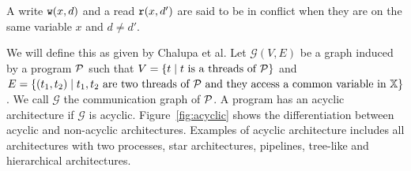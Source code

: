 \smallskip 

 A write $\mathtt{w}(x,d)$ and a read $\mathtt{r}(x,d')$ are said to be in conflict when they are on the same variable $x$ 
and $d \neq d'$. 

\smallskip

 We will define this as given by Chalupa et al. \cite{Data-centricDPOR} Let $\mathcal{G}(V,E)$ be a graph induced by a program ${\mathcal P}$ such that $V=\{t\mid t \text{ is a threads of }{\mathcal P}\}$ and $E=\{(t_1,t_2)\mid t_1,t_2 \text{ are two threads of }{\mathcal P} \text{ and they access a common variable in } {\mathbb X} \}$. We call $\mathcal{G}$ the communication graph of ${\mathcal P}$. A program has an acyclic architecture if $\mathcal{G}$ is acyclic. Figure~\ref{fig:acyclic} shows the differentiation between acyclic and non-acyclic architectures.  Examples of acyclic architecture includes all architectures with two processes, star architectures, pipelines, tree-like and hierarchical
architectures.

